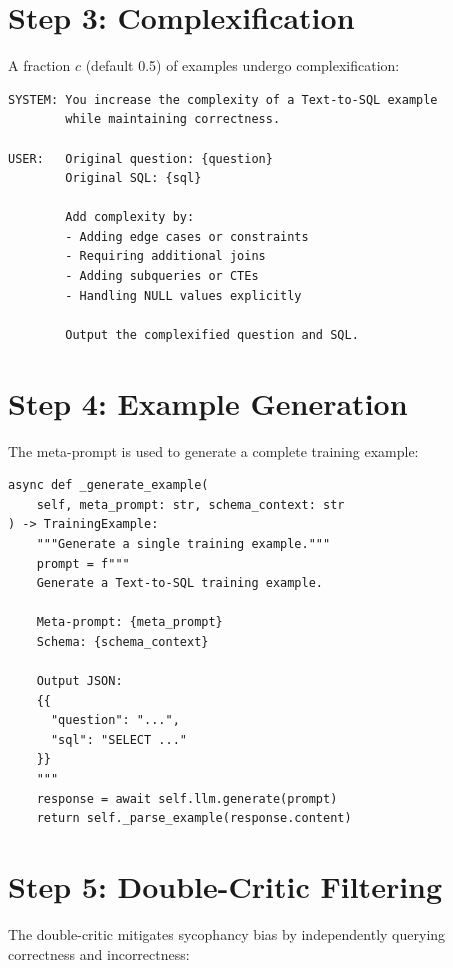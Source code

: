 \section{Step 3: Complexification}

A fraction $c$ (default 0.5) of examples undergo complexification:

\begin{lstlisting}[language=jsonx,caption={Complexification prompt}]
SYSTEM: You increase the complexity of a Text-to-SQL example
        while maintaining correctness.
        
USER:   Original question: {question}
        Original SQL: {sql}
        
        Add complexity by:
        - Adding edge cases or constraints
        - Requiring additional joins
        - Adding subqueries or CTEs
        - Handling NULL values explicitly
        
        Output the complexified question and SQL.
\end{lstlisting}

\section{Step 4: Example Generation}

The meta-prompt is used to generate a complete training example:

\begin{lstlisting}[language=jsonx,caption={Example generation}]
async def _generate_example(
    self, meta_prompt: str, schema_context: str
) -> TrainingExample:
    """Generate a single training example."""
    prompt = f"""
    Generate a Text-to-SQL training example.
    
    Meta-prompt: {meta_prompt}
    Schema: {schema_context}
    
    Output JSON:
    {{
      "question": "...",
      "sql": "SELECT ..."
    }}
    """
    response = await self.llm.generate(prompt)
    return self._parse_example(response.content)
\end{lstlisting}

\section{Step 5: Double-Critic Filtering}

The double-critic mitigates sycophancy bias by independently querying correctness
and incorrectness:

